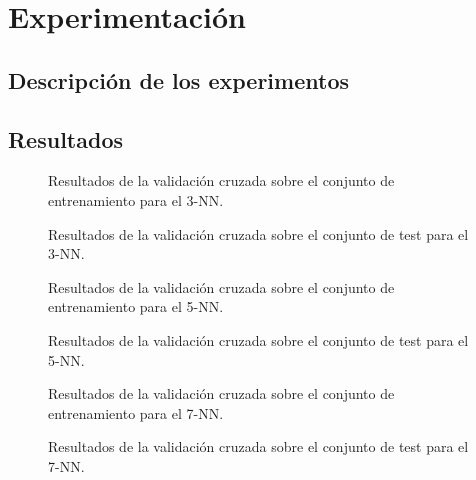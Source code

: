\chapter{Experimentación}

\section{Descripción de los experimentos}

\section{Resultados}

\begin{figure}[h]
\resizebox{\textwidth}{!}{%
    
}
\caption{Resultados de la validación cruzada sobre el conjunto de entrenamiento para el 3-NN.}
\end{figure}

\begin{figure}[h]
\resizebox{\textwidth}{!}{%
    
}
\caption{Resultados de la validación cruzada sobre el conjunto de test para el 3-NN.}
\end{figure}

\begin{figure}[h]
\resizebox{\textwidth}{!}{%
    
}
\caption{Resultados de la validación cruzada sobre el conjunto de entrenamiento para el 5-NN.}
\end{figure}

\begin{figure}[h]
\resizebox{\textwidth}{!}{%
    
}
\caption{Resultados de la validación cruzada sobre el conjunto de test para el 5-NN.}
\end{figure}

\begin{figure}[h]
\resizebox{\textwidth}{!}{%
    
}
\caption{Resultados de la validación cruzada sobre el conjunto de entrenamiento para el 7-NN.}
\end{figure}

\begin{figure}[h]
\resizebox{\textwidth}{!}{%
    
}
\caption{Resultados de la validación cruzada sobre el conjunto de test para el 7-NN.}
\end{figure}

